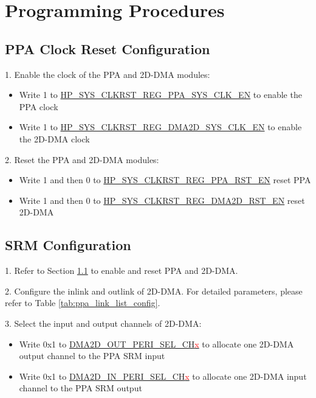 \documentclass[main\_\_EN.tex]{subfiles}
\begin{document}

\section{Programming Procedures}
\label{sec:ppa-prog-procedures}

\subsection{PPA Clock Reset Configuration}
\label{sec:ppa_clk_rst}

1. Enable the clock of the PPA and 2D-DMA modules:
\begin{itemize}
    \item Write 1 to \hyperref[fielddesc:HPSYSCLKRSTREGPPASYSCLKEN]{HP\_SYS\_CLKRST\_REG\_PPA\_SYS\_CLK\_EN} to enable the PPA clock
    \item Write 1 to \hyperref[fielddesc:HPSYSCLKRSTREGDMA2DSYSCLKEN]{HP\_SYS\_CLKRST\_REG\_DMA2D\_SYS\_CLK\_EN} to enable the 2D-DMA clock
\end{itemize}

2. Reset the PPA and 2D-DMA modules:
\begin{itemize}
    \item Write 1 and then 0 to \hyperref[fielddesc:HPSYSCLKRSTREGPPARSTEN]{HP\_SYS\_CLKRST\_REG\_PPA\_RST\_EN} reset PPA
    \item Write 1 and then 0 to \hyperref[fielddesc:HPSYSCLKRSTREGDMA2DRSTEN]{HP\_SYS\_CLKRST\_REG\_DMA2D\_RST\_EN} reset 2D-DMA
\end{itemize}

\subsection{SRM Configuration}

1. Refer to Section \ref{sec:ppa_clk_rst} to enable and reset PPA and 2D-DMA.

2. Configure the inlink and outlink of 2D-DMA. For detailed parameters, please refer to Table \ref{tab:ppa_link_list_config}.

3. Select the input and output channels of 2D-DMA:
\begin{itemize}
    \item Write 0x1 to \hyperref[fielddesc:DMA2DOUTPERISELCHN]{DMA2D\_OUT\_PERI\_SEL\_CH\textcolor{red}{x}} to allocate one 2D-DMA output channel to the PPA SRM input
    \item Write 0x1 to \hyperref[fielddesc:DMA2DINPERISELCHN]{DMA2D\_IN\_PERI\_SEL\_CH\textcolor{red}{x}} to allocate one 2D-DMA input channel to the PPA SRM output
\end{itemize}
\end{document}
